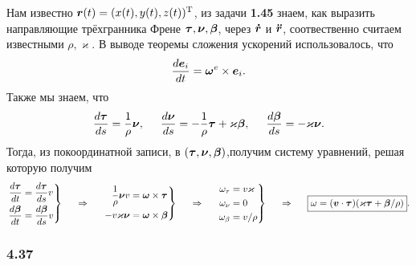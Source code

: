 Нам известно $\mbox{\boldmath $r$}(t) = (x(t), y(t), z(t))^{\text{T}}$, из задачи \textbf{1.45} знаем, как выразить
направляющие трёхгранника Френе $\mbox{\boldmath $\tau$}, \mbox{\boldmath $\nu$}, \mbox{\boldmath $\beta$}$, через $\mbox{\boldmath $\dot{r}$}$ и $\mbox{\boldmath $\ddot{r}$}$, соотвественно считаем известными $\rho, \varkappa$. В выводе теоремы сложения ускорений использовалось, что
\begin{equation}
\label{432_1}
    \frac{d \mbox{\boldmath $e$}_i}{dt} = \mbox{\boldmath $\omega$}^e \times \mbox{\boldmath $e$}_i.
\end{equation}
Также мы знаем, что
\begin{equation}
\label{432_2}
    \frac{d \mbox{\boldmath $\tau$}}{ds} = \frac{1}{\rho} \mbox{\boldmath $\nu$},
    \hspace{0.5cm}
    \frac{d \mbox{\boldmath $\nu$}}{ds} = -\frac{1}{\rho}  \mbox{\boldmath $\tau$} + \varkappa \mbox{\boldmath $\beta$},
    \hspace{0.5cm} 
    \frac{d \mbox{\boldmath $\beta$}}{d s} = - \varkappa \mbox{\boldmath $\nu$}.
\end{equation}
Тогда, из покоординатной записи, в $(\mbox{\boldmath $\tau$}, \mbox{\boldmath $\nu$}, \mbox{\boldmath $\beta$})$,получим систему уравнений, решая которую получим
$$
    \left.\begin{aligned}
        \frac{d \mbox{\boldmath $\tau$}}{dt}  &= \frac{d \mbox{\boldmath $\tau$}}{ds} v \\
        \frac{d \mbox{\boldmath $\beta$}}{d t} &= \frac{d \mbox{\boldmath $\beta$}}{d s} v 
    \end{aligned}\right\}
    \hspace{0.5cm} \Rightarrow \hspace{0.5cm} 
    \left.\begin{aligned}
        \frac{1}{\rho} \mbox{\boldmath $\nu$} v &= \mbox{\boldmath $\omega$} \times \mbox{\boldmath $\tau$} \\
        - v \varkappa \mbox{\boldmath $\nu$} &= \mbox{\boldmath $\omega$} \times \mbox{\boldmath $\beta$}
    \end{aligned}\right\}
    \hspace{0.5cm} \Rightarrow \hspace{0.5cm} 
    \left.\begin{aligned}
        \omega_\tau &= v \varkappa \\
        \omega_\nu &= 0 \\
        \omega_\beta &= v / \rho
    \end{aligned}\right\}
    \hspace{0.5cm} \Rightarrow \hspace{0.5cm} 
    \boxed{
         \omega = (\mbox{\boldmath $v$} \cdot \mbox{\boldmath $\tau$}) (\varkappa \mbox{\boldmath $\tau$} + \mbox{\boldmath $\beta$} / \rho)   
    }.
$$

\subsubsection*{4.37}

